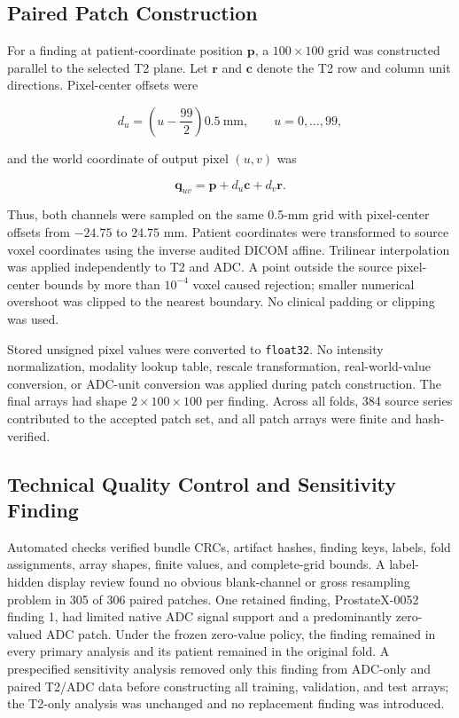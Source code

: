 \documentclass[11pt]{article}
\begin{document}
\subsection{Paired Patch Construction}\label{sec:3.3}

For a finding at patient-coordinate position $\mathbf{p}$, a $100\times100$ grid was constructed parallel to the selected T2 plane. Let $\mathbf{r}$ and $\mathbf{c}$ denote the T2 row and column unit directions. Pixel-center offsets were

\begin{equation}
d_u=\left(u-\frac{99}{2}\right)0.5\ \mathrm{mm},\qquad u=0,\ldots,99,
\end{equation}

and the world coordinate of output pixel $(u,v)$ was

\begin{equation}
\mathbf{q}_{uv}=\mathbf{p}+d_u\mathbf{c}+d_v\mathbf{r}.
\label{eq:patch-grid}
\end{equation}

Thus, both channels were sampled on the same 0.5-mm grid with pixel-center offsets from $-24.75$ to $24.75$ mm. Patient coordinates were transformed to source voxel coordinates using the inverse audited DICOM affine. Trilinear interpolation was applied independently to T2 and ADC. A point outside the source pixel-center bounds by more than $10^{-4}$ voxel caused rejection; smaller numerical overshoot was clipped to the nearest boundary. No clinical padding or clipping was used.

Stored unsigned pixel values were converted to \texttt{float32}. No intensity normalization, modality lookup table, rescale transformation, real-world-value conversion, or ADC-unit conversion was applied during patch construction. The final arrays had shape $2\times100\times100$ per finding. Across all folds, 384 source series contributed to the accepted patch set, and all patch arrays were finite and hash-verified.

\subsection{Technical Quality Control and Sensitivity Finding}\label{sec:3.4}

Automated checks verified bundle CRCs, artifact hashes, finding keys, labels, fold assignments, array shapes, finite values, and complete-grid bounds. A label-hidden display review found no obvious blank-channel or gross resampling problem in 305 of 306 paired patches. One retained finding, ProstateX-0052 finding 1, had limited native ADC signal support and a predominantly zero-valued ADC patch. Under the frozen zero-value policy, the finding remained in every primary analysis and its patient remained in the original fold. A prespecified sensitivity analysis removed only this finding from ADC-only and paired T2/ADC data before constructing all training, validation, and test arrays; the T2-only analysis was unchanged and no replacement finding was introduced.
\end{document}
